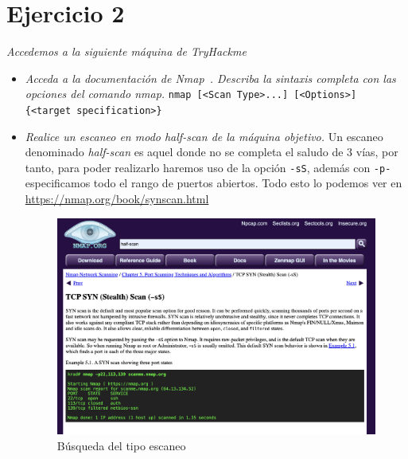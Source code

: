 \documentclass[12pt]{book}
\begin{document}
\section{Ejercicio 2}
\textit{Accedemos a la siguiente máquina de TryHackme~\cite{TryHackmeNmapRoom}}
\begin{itemize}
    \item \textit{Acceda a la documentación de Nmap~\cite{Nmap}. Describa la sintaxis completa con las opciones del comando nmap.}
    \newline
    \newline
\verb|nmap [<Scan Type>...] [<Options>] {<target specification>}|
    \item \textit{Realice un escaneo en modo half-scan de la máquina objetivo.}
    \newline
    \newline
    Un escaneo denominado \textit{half-scan} es aquel donde no se completa el saludo de 3 vías, por tanto, para poder realizarlo haremos uso de la opción \texttt{-sS}, además con \texttt{-p-} especificamos todo el rango de puertos abiertos.
    Todo esto lo podemos ver en \hyperlink{Nmap Half-Scan}{https://nmap.org/book/synscan.html}

    \begin{figure}[h]
        \centering
        \includegraphics[width=.7\linewidth]{Practica 3y4/images/Screenshot 2024-11-07 at 09.44.38.png}
        \caption{Búsqueda del tipo escaneo}
        \label{fig:enter-label}
    \end{figure}
    

\end{itemize}
\end{document}

